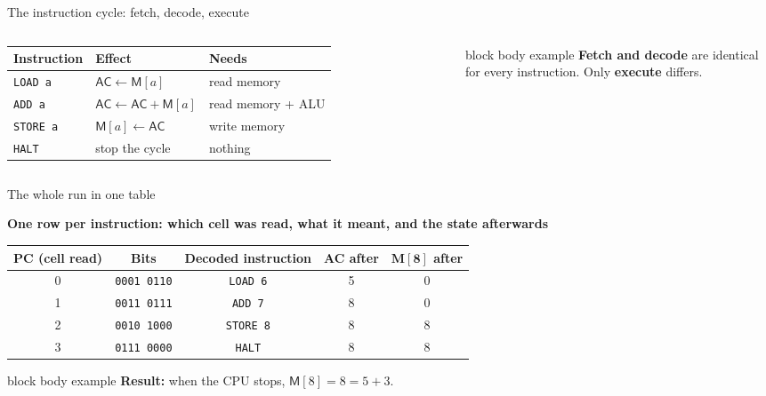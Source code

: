 \documentclass[aspectratio=169,10pt]{beamer}
\begin{document}
\begin{frame}{The instruction cycle: fetch, decode, execute}
\begin{columns}[T,onlytextwidth]
      \scriptsize
      \renewcommand{\arraystretch}{1.05}
      \begin{tabular}{llp{2.5cm}}
        \toprule
        \textbf{Instruction} & \textbf{Effect} & \textbf{Needs} \\
        \midrule
        \texttt{LOAD a}  & $\mathsf{AC}\leftarrow\mathsf{M}[a]$ & read memory \\
        \texttt{ADD a}   & $\mathsf{AC}\leftarrow\mathsf{AC}+\mathsf{M}[a]$ & read memory + ALU \\
        \texttt{STORE a} & $\mathsf{M}[a]\leftarrow\mathsf{AC}$ & write memory \\
        \texttt{HALT}    & stop the cycle & nothing \\
        \bottomrule
      \end{tabular}
      \begin{beamercolorbox}[rounded=true,sep=0.12cm,wd=\linewidth]{block body example}
        \scriptsize
        \textbf{Fetch and decode} are identical for every instruction.
        Only \textbf{execute} differs.
      \end{beamercolorbox}
  \end{columns}
\end{frame}



\begin{frame}{The whole run in one table}
  \begin{center}
    \footnotesize\textbf{One row per instruction: which cell was read, what it meant, and the state afterwards}\\[0.12cm]
    \renewcommand{\arraystretch}{1.35}
    \begin{tabular}{ccccc}
      \toprule
      \textbf{PC (cell read)} & \textbf{Bits} & \textbf{Decoded instruction} & \textbf{AC after} & $\mathbf{M[8]}$ \textbf{after} \\
      \midrule
      0 & \mbox{\texttt{0001 0110}} & \texttt{LOAD 6}  & 5 & 0 \\
      1 & \mbox{\texttt{0011 0111}} & \texttt{ADD 7}   & 8 & 0 \\
      2 & \mbox{\texttt{0010 1000}} & \texttt{STORE 8} & 8 & 8 \\
      3 & \mbox{\texttt{0111 0000}} & \texttt{HALT}    & 8 & 8 \\
      \bottomrule
    \end{tabular}
  \end{center}
  \vspace{0.2cm}
  \begin{beamercolorbox}[rounded=true,sep=0.12cm,wd=\textwidth]{block body example}
    \centering\small
    \textbf{Result:} when the CPU stops, $\mathsf{M}[8] = 8 = 5 + 3$.
  \end{beamercolorbox}
\end{frame}
\end{document}
